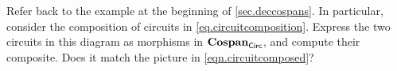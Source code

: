 \documentclass[7Sketches]{subfiles}
\begin{document}
\begin{exercise} %
\label{exc.composefcospans}
Refer back to the example at the beginning of \cref{sec.deccospans}. In
particular, consider the composition of circuits in
\cref{eq.circuitcomposition}. Express the two circuits in this diagram as
morphisms in $\mathbf{Cospan}_{\mathsf{Circ}}$, and compute their composite. Does it match the
picture in \cref{eqn.circuitcomposed}?
\end{exercise}

%
\end{document}
